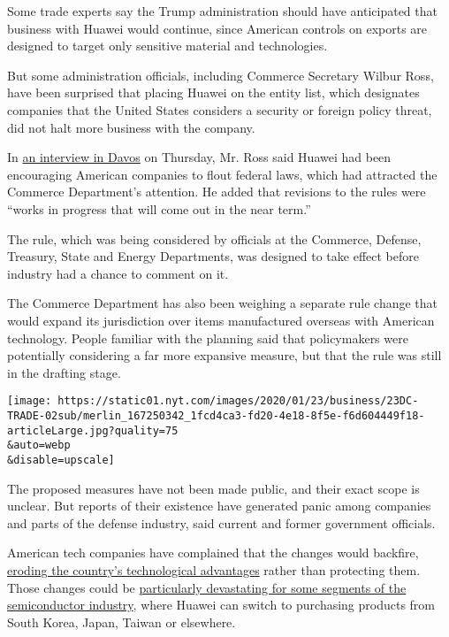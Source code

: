 Some trade experts say the Trump administration should have anticipated
that business with Huawei would continue, since American controls on
exports are designed to target only sensitive material and technologies.

But some administration officials, including Commerce Secretary Wilbur
Ross, have been surprised that placing Huawei on the entity list, which
designates companies that the United States considers a security or
foreign policy threat, did not halt more business with the company.

In
\href{https://www.bloomberg.com/news/videos/2020-01-23/wilbur-ross-says-u-s-not-cutting-huawei-off-from-exports-video}{an
interview in Davos} on Thursday, Mr. Ross said Huawei had been
encouraging American companies to flout federal laws, which had
attracted the Commerce Department's attention. He added that revisions
to the rules were ``works in progress that will come out in the near
term.''

The rule, which was being considered by officials at the Commerce,
Defense, Treasury, State and Energy Departments, was designed to take
effect before industry had a chance to comment on it.

The Commerce Department has also been weighing a separate rule change
that would expand its jurisdiction over items manufactured overseas with
American technology. People familiar with the planning said that
policymakers were potentially considering a far more expansive measure,
but that the rule was still in the drafting stage.

\texttt{[image: https://static01.nyt.com/images/2020/01/23/business/23DC-TRADE-02sub/merlin\_167250342\_1fcd4ca3-fd20-4e18-8f5e-f6d604449f18-articleLarge.jpg?quality=75\\\&auto=webp\\\&disable=upscale]}

The proposed measures have not been made public, and their exact scope
is unclear. But reports of their existence have generated panic among
companies and parts of the defense industry, said current and former
government officials.

American tech companies have complained that the changes would backfire,
\href{https://www.nytimes.com/2020/01/20/business/economy/trump-us-china-deal-micron-trade-war.html}{eroding
the country's technological advantages} rather than protecting them.
Those changes could be
\href{https://www.nytimes.com/2020/01/20/business/economy/trump-us-china-deal-micron-trade-war.html}{particularly
devastating for some segments of the semiconductor industry}, where
Huawei can switch to purchasing products from South Korea, Japan, Taiwan
or elsewhere.

